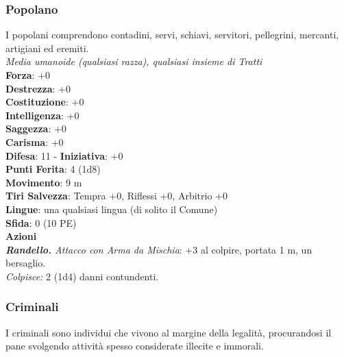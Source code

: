 \begin{multicols}{2}
\subsubsection{Popolano}
I popolani comprendono contadini, servi, schiavi, servitori, pellegrini, mercanti, artigiani ed eremiti.\\
\emph{Media umanoide (qualsiasi razza), qualsiasi insieme di Tratti}\\
\textbf{Forza}: +0\\
\textbf{Destrezza}: +0\\
\textbf{Costituzione}: +0\\
\textbf{Intelligenza}: +0\\
\textbf{Saggezza}: +0\\
\textbf{Carisma}: +0\\
\textbf{Difesa}: 11 - \textbf{Iniziativa}: +0\\
\textbf{Punti Ferita}: 4 (1d8)\\
\textbf{Movimento}: 9 m\\
\textbf{Tiri Salvezza}: Tempra +0, Riflessi +0, Arbitrio +0 \\
\textbf{Lingue}: una qualsiasi lingua (di solito il Comune)\\
\textbf{Sfida}: 0 (10 PE)\smallskip\\
\smallskip\textbf{Azioni}\\
\emph{\textbf{Randello.} Attacco con Arma da Mischia}: +3 al colpire, portata 1 m, un bersaglio.\\
\emph{Colpisce:} 2 (1d4) danni contundenti.\\

\subsubsection{Criminali}

I criminali sono individui che vivono al margine della legalità, procurandosi il pane svolgendo attività spesso considerate illecite e immorali.\\


\end{multicols}
